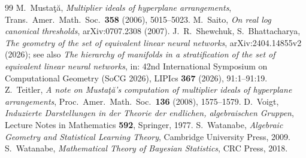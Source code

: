 \documentclass[11pt,a4paper]{article}
\theoremstyle{definition}
\theoremstyle{remark}
\numberwithin{equation}{section}
\begin{document}
\begin{thebibliography}{99}
 M.~Mustaţă, \emph{Multiplier ideals of hyperplane arrangements}, Trans.\ Amer.\ Math.\ Soc.\ \textbf{358} (2006), 5015--5023.
 M.~Saito, \emph{On real log canonical thresholds}, arXiv:0707.2308 (2007).
 J.~R.~Shewchuk, S.~Bhattacharya, \emph{The geometry of the set of equivalent linear neural networks}, arXiv:2404.14855v2 (2026); see also \emph{The hierarchy of manifolds in a stratification of the set of equivalent linear neural networks}, in: 42nd International Symposium on Computational Geometry (SoCG 2026), LIPIcs \textbf{367} (2026), 91:1--91:19.
 Z.~Teitler, \emph{A note on Mustaţă's computation of multiplier ideals of hyperplane arrangements}, Proc.\ Amer.\ Math.\ Soc.\ \textbf{136} (2008), 1575--1579.
 D.~Voigt, \emph{Induzierte Darstellungen in der Theorie der endlichen, algebraischen Gruppen}, Lecture Notes in Mathematics \textbf{592}, Springer, 1977.
 S.~Watanabe, \emph{Algebraic Geometry and Statistical Learning Theory}, Cambridge University Press, 2009.
 S.~Watanabe, \emph{Mathematical Theory of Bayesian Statistics}, CRC Press, 2018.
\end{thebibliography}
\end{document}
